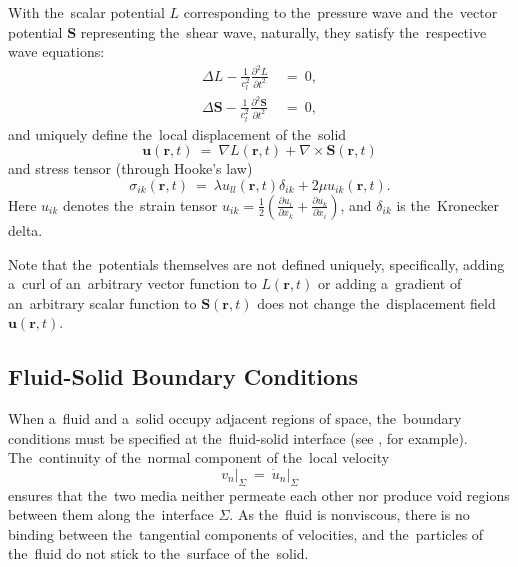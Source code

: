 With the~scalar potential $L$ corresponding to the~pressure wave and the~vector potential $\mathbf{S}$ representing the~shear wave, naturally, they satisfy the~respective wave equations:
\begin{align}
\Delta L - \frac{1}{c_l^2}\frac{\partial^2 L}{\partial t^2}~&=~0, \label{eq:waveeqLRayleigh}\\
\Delta \mathbf{S} - \frac{1}{c_t^2}\frac{\partial^2 \mathbf{S}}{\partial t^2}~&=~0, \label{eq:waveeqSRayleigh}
\end{align}
and uniquely define the~local displacement of the~solid
\begin{equation}
\label{eq:displacementRayleigh}
\mathbf{u}(\mathbf{r}, t)~=~\nabla L(\mathbf{r}, t) + \nabla\times\mathbf{S}(\mathbf{r}, t)
\end{equation}
and stress tensor (through Hooke's law)
\begin{equation}
\label{eq:HookesLawRayleigh}
\sigma_{ik}(\mathbf{r}, t)~=~\lambda u_{ll}(\mathbf{r}, t)\delta_{ik} + 2\mu u_{ik}(\mathbf{r}, t).
\end{equation}
Here $u_{ik}$ denotes the~strain tensor $u_{ik}=\frac12\left(\frac{\partial u_i}{\partial x_k}+\frac{\partial u_k}{\partial x_i}\right)$, and $\delta_{ik}$ is the~Kronecker delta.

Note that the~potentials themselves are not defined uniquely, specifically, adding a~curl of an~arbitrary vector function to $L(\mathbf{r}, t)$ or adding a~gradient of an~arbitrary scalar function to $\mathbf{S}(\mathbf{r}, t)$ does not change the~displacement field $\mathbf{u}(\mathbf{r}, t)$.


\subsection{Fluid-Solid Boundary Conditions}

When a~fluid and a~solid occupy adjacent regions of space, the~boundary conditions must be specified at the~fluid-solid interface (see \cite{lloyd}, for example).
The~continuity of the~normal component of the~local velocity
\begin{equation}
\label{eq:boundaryVelocityRayleigh}
\left.v_n\right|_\Sigma~=~\left.\dot{u}_n\right|_\Sigma
\end{equation}
ensures that the~two media neither permeate each other nor produce void regions between them along the~interface $\Sigma$.
As the~fluid is nonviscous, there is no binding between the~tangential components of velocities, and the~particles of the~fluid do not stick to the~surface of the~solid.

